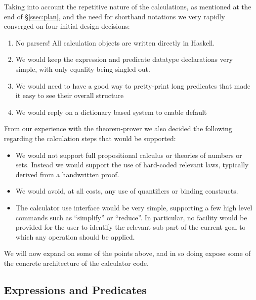 Taking into account the repetitive nature of the calculations,
as mentioned at the end of \S\ref{ssec:plan},
and the need for shorthand notations we very rapidly converged
on four initial design decisions:
\begin{enumerate}
  \item No parsers! All calculation objects are written
  directly in Haskell.
  \item We would keep the expression and predicate datatype declarations
   very simple, with only equality being singled out.
  \item We would need to have a good way to pretty-print long predicates
    that made it easy to see their overall structure
  \item We would reply on a dictionary based system to enable default

\end{enumerate}
From our experience with the  theorem-prover we also decided
the following regarding the calculation steps that would be supported:
\begin{itemize}
  \item
    We would not support full  propositional calculus
    or theories of numbers or sets.
    Instead we would support the use of hard-coded relevant laws,
    typically derived from  a handwritten proof.
  \item
    We would avoid, at all costs,
    any use of quantifiers or binding constructs.
  \item
    The calculator use interface would be very simple,
    supporting a few high level commands such as ``simplify''
    or ``reduce''.
    In particular,
    no facility would be provided for the user to identify
    the relevant sub-part of the current goal to which any operation
    should be applied.
\end{itemize}

We will now expand on some of the points above,
and in so doing expose some of the concrete architecture of the calculator code.

\subsection{Expressions and Predicates}\label{ssec:expr-pred}

